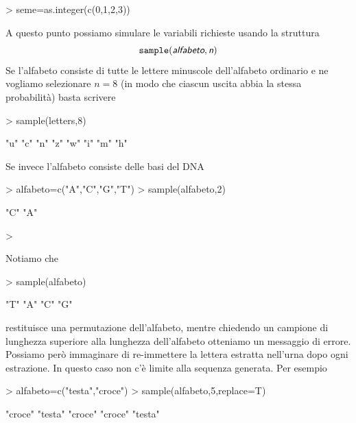 \documentclass[onecolumn,11pt]{book}
\newcommand{\varia}[1]{\textsl{\textsf{#1}}}
\begin{document}
\begin{Schunk}
\begin{Sinput}
> seme=as.integer(c(0,1,2,3))
\end{Sinput}
\end{Schunk}
A questo punto possiamo simulare le variabili richieste usando la struttura
\begin{equation}\texttt{sample}(\varia{alfabeto},\varia{n})\end{equation}
Se l'alfabeto consiste di tutte le lettere minuscole dell'alfabeto ordinario e ne vogliamo selezionare $n=8$  (in modo che ciascun uscita abbia la stessa probabilit\`a)  basta scrivere
\begin{Schunk}
\begin{Sinput}
> sample(letters,8)
\end{Sinput}
\begin{Soutput}
[1] "u" "c" "n" "z" "w" "i" "m" "h"
\end{Soutput}
\end{Schunk}
  Se invece l'alfabeto consiste delle basi del DNA
\begin{Schunk}
\begin{Sinput}
> alfabeto=c("A","C","G","T")
> sample(alfabeto,2)
\end{Sinput}
\begin{Soutput}
[1] "C" "A"
\end{Soutput}
\begin{Sinput}
> 
\end{Sinput}
\end{Schunk}
Notiamo che  
\begin{Schunk}
\begin{Sinput}
>  sample(alfabeto)
\end{Sinput}
\begin{Soutput}
[1] "T" "A" "C" "G"
\end{Soutput}
\end{Schunk}
restituisce una permutazione dell'alfabeto, mentre chiedendo un campione di lunghezza superiore alla lunghezza dell'alfabeto otteniamo un messaggio di errore. Possiamo per\`o immaginare di re-immettere la lettera estratta nell'urna dopo ogni estrazione. In questo caso non c'\`e limite alla sequenza generata.
Per esempio
\begin{Schunk}
\begin{Sinput}
> alfabeto=c("testa","croce")
> sample(alfabeto,5,replace=T)
\end{Sinput}
\begin{Soutput}
[1] "croce" "testa" "croce" "croce" "testa"
\end{Soutput}
\end{Schunk}
\end{document}
